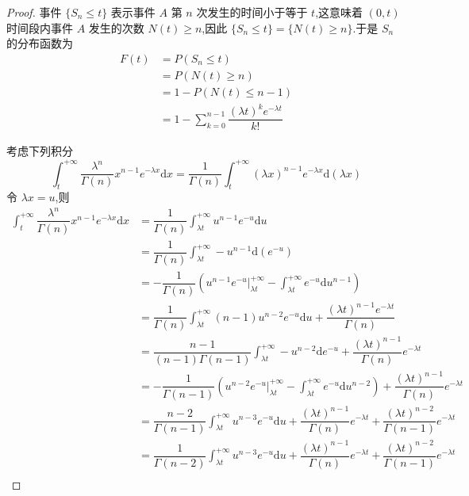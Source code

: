 \begin{proof}
    事件 $\{ S_n \leqslant t \}$ 表示事件 $A$ 第 $n$ 次发生的时间小于等于 $t$,这意味着 $(0,t)$ 时间段内事件 $A$ 发生的次数 $N(t) \geqslant n$,因此 $\{ S_n \leqslant t \} = \{ N(t) \geqslant n \}$.于是 $S_n$ 的分布函数为
    $$
    \begin{aligned}
        F(t) &= P(S_n \leqslant t) \\
        &= P(N(t) \geqslant n) \\
        &= 1 - P(N(t) \leqslant n-1) \\
        &= 1 - \sum_{k=0}^{n-1} \dfrac{(\lambda t)^k e^{-\lambda t}}{k!}
    \end{aligned}
    $$

    考虑下列积分
    $$
    \int_{t}^{+\infty} \dfrac{\lambda^n}{\Gamma(n)} x^{n-1} e^{-\lambda x} \text{d}x = \dfrac{1}{\Gamma(n)} \int_{t}^{+\infty} (\lambda x)^{n-1} e^{-\lambda x} \text{d}(\lambda x)
    $$
    令 $\lambda x = u$,则
    $$
    \begin{aligned}
        \int_{t}^{+\infty} \dfrac{\lambda^n}{\Gamma(n)} x^{n-1} e^{-\lambda x} \text{d}x &= \dfrac{1}{\Gamma(n)} \int_{\lambda t}^{+\infty} u^{n-1} e^{-u} \text{d}u \\
        &= \dfrac{1}{\Gamma(n)} \int_{\lambda t}^{+\infty} -u^{n-1} \text{d}(e^{-u}) \\
        &= -\dfrac{1}{\Gamma(n)} \left( u^{n-1} e^{-u} \Big|_{\lambda t}^{+\infty} - \int_{\lambda t}^{+\infty} e^{-u} \text{d} u^{n-1} \right) \\
        &= \dfrac{1}{\Gamma(n)} \int_{\lambda t}^{+\infty} (n-1) u^{n-2} e^{-u} \text{d}u + \dfrac{(\lambda t)^{n-1} e^{-\lambda t}}{\Gamma(n)} \\
        &= \dfrac{n-1}{(n-1) \Gamma(n-1)} \int_{\lambda t}^{+\infty} -u^{n-2} \text{d} e^{-u} + \dfrac{(\lambda t)^{n-1}}{\Gamma(n)} e^{-\lambda t} \\
        &= -\dfrac{1}{\Gamma(n-1)} \left( u^{n-2} e^{-u} \Big|_{\lambda t}^{+\infty} - \int_{\lambda t}^{+\infty} e^{-u} \text{d} u^{n-2} \right) + \dfrac{(\lambda t)^{n-1}}{\Gamma(n)} e^{-\lambda t} \\
        &= \dfrac{n-2}{\Gamma(n-1)} \int_{\lambda t}^{+\infty} u^{n-3} e^{-u} \text{d}u + \dfrac{(\lambda t)^{n-1}}{\Gamma(n)} e^{-\lambda t} + \dfrac{(\lambda t)^{n-2}}{\Gamma(n-1)} e^{-\lambda t} \\
        &= \dfrac{1}{\Gamma(n-2)} \int_{\lambda t}^{+\infty} u^{n-3} e^{-u} \text{d}u + \dfrac{(\lambda t)^{n-1}}{\Gamma(n)} e^{-\lambda t} + \dfrac{(\lambda t)^{n-2}}{\Gamma(n-1)} e^{-\lambda t} \\

\end{aligned}$$
\end{proof}
